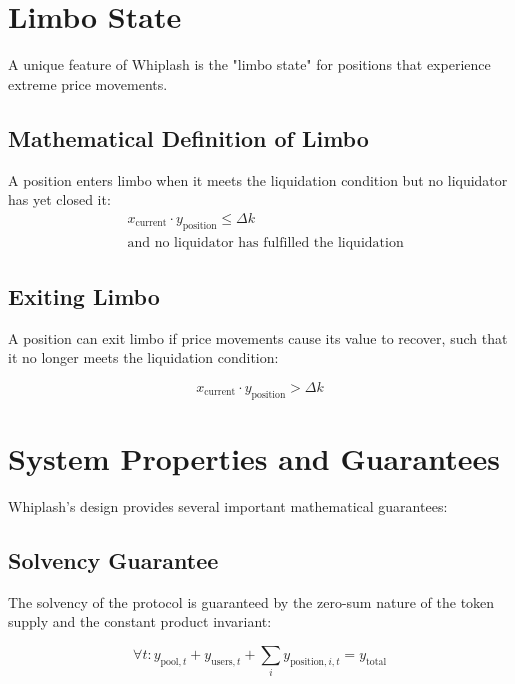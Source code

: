 \documentclass[11pt]{article}
\begin{document}
\section{Limbo State}

A unique feature of Whiplash is the "limbo state" for positions that experience extreme price movements.

\subsection{Mathematical Definition of Limbo}

A position enters limbo when it meets the liquidation condition but no liquidator has yet closed it:
\begin{equation}
\begin{aligned}
&x_{\text{current}} \cdot y_{\text{position}} \le \Delta k \\
&\text{and no liquidator has fulfilled the liquidation}
\end{aligned}
\end{equation}

\subsection{Exiting Limbo}

A position can exit limbo if price movements cause its value to recover, such that it no longer meets the liquidation condition:

\begin{equation}
x_{\text{current}} \cdot y_{\text{position}} > \Delta k
\end{equation}

\section{System Properties and Guarantees}

Whiplash's design provides several important mathematical guarantees:

\subsection{Solvency Guarantee}

The solvency of the protocol is guaranteed by the zero-sum nature of the token supply and the constant product invariant:

\begin{equation}
\forall t: y_{\text{pool},t} + y_{\text{users},t} + \sum_{i} y_{\text{position},i,t} = y_{\text{total}}
\end{equation}
\end{document}
